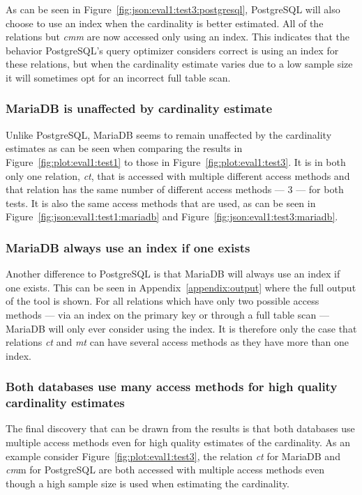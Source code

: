 As can be seen in Figure~\ref{fig:json:eval1:test3:postgresql}, PostgreSQL will also choose
to use an index when the cardinality is better estimated. All of the relations
but \textit{cmm} are now accessed only using an index. This indicates that the
behavior PostgreSQL's query optimizer considers correct is using an index for
these relations, but when the cardinality estimate varies due to a low sample
size it will sometimes opt for an incorrect full table scan.

\subsubsection{MariaDB is unaffected by cardinality estimate}
Unlike PostgreSQL, MariaDB seems to remain unaffected by the cardinality
estimates as can be seen when comparing the results in
Figure~\ref{fig:plot:eval1:test1} to those in Figure~\ref{fig:plot:eval1:test3}.
It is in both only one relation, \textit{ct}, that is accessed with multiple different
access methods and that relation has the same number of different access methods
--- 3 --- for both tests. It is also the same access methods that are used, as
can be seen in Figure~\ref{fig:json:eval1:test1:mariadb} and
Figure~\ref{fig:json:eval1:test3:mariadb}.

\subsubsection{MariaDB always use an index if one exists}
Another difference to PostgreSQL is that MariaDB will always use an index if one
exists. This can be seen in Appendix~\ref{appendix:output} where the full output
of the tool is shown. For all relations which have only two possible access
methods --- via an index on the primary key or through a full table scan ---
MariaDB will only ever consider using the index. It is therefore only the case
that relations \textit{ct} and \textit{mt} can have several access methods as
they have more than one index.

\subsubsection{Both databases use many access methods for high quality
  cardinality estimates}
The final discovery that can be drawn from the results is that both databases
use multiple access methods even for high quality estimates of the cardinality.
As an example consider Figure~\ref{fig:plot:eval1:test3}, the relation
\textit{ct} for MariaDB and \textit{cm}m for PostgreSQL are both accessed with
multiple access methods even though a high sample size is used when estimating
the cardinality.

